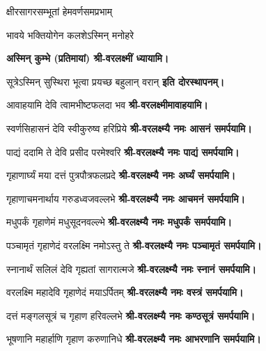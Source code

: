 \begin{center}

{क्षीरसागरसम्भूतां हेमवर्णसमप्रभाम्}

{भावये भक्तियोगेन कलशेऽस्मिन् मनोहरे} 

\textbf{अस्मिन् कुम्भे (प्रतिमायां) श्री-वरलक्ष्मीं ध्यायामि।}
\medskip


{सूत्रेऽस्मिन् सुस्थिरा भूत्वा प्रयच्छ बहुलान् वरान्} 
\textbf{इति दोरस्थापनम्।}\medskip

{आवाहयामि देवि त्वामभीष्टफलदा भव}
\textbf{श्री-वरलक्ष्मीमावाहयामि।}

{स्वर्णसिहासनं देवि स्वीकुरुष्व हरिप्रिये} 
\textbf{श्री-वरलक्ष्म्यै नमः आसनं समर्पयामि।}


{पाद्यं ददामि ते देवि प्रसीद परमेश्वरि}
\textbf{श्री-वरलक्ष्म्यै नमः पाद्यं समर्पयामि।}
\medskip

{गृहाणार्घ्यं मया दत्तं पुत्रपौत्रफलप्रदे}
\textbf{श्री-वरलक्ष्म्यै नमः अर्घ्यं समर्पयामि।}
\medskip

{गृहाणाचमनार्थाय गरुडध्वजवल्लभे}
\textbf{श्री-वरलक्ष्म्यै नमः आचमनं समर्पयामि।}
\medskip

{मधुपर्कं गृहाणेमं मधुसूदनवल्ल्भे}
\textbf{श्री-वरलक्ष्म्यै नमः मधुपर्कं समर्पयामि।}
\medskip

{पञ्चामृतं गृहाणेदं वरलक्ष्मि नमोऽस्तु ते}
\textbf{श्री-वरलक्ष्म्यै नमः पञ्चामृतं समर्पयामि।}
\medskip

{स्नानार्थं सलिलं देवि गृह्यतां सागरात्मजे}
\textbf{श्री-वरलक्ष्म्यै नमः स्नानं समर्पयामि।}
\medskip

{वरलक्ष्मि महादेवि गृहाणेदं मयाऽर्पितम्}
\textbf{श्री-वरलक्ष्म्यै नमः वस्त्रं समर्पयामि।}
\medskip

{दत्तं मङ्गलसूत्रं च गृहाण हरिवल्लभे}
\textbf{श्री-वरलक्ष्म्यै नमः कण्ठसूत्रं समर्पयामि।}
\medskip

{भूषणानि महार्हाणि गृहाण करुणानिधे}
\textbf{श्री-वरलक्ष्म्यै नमः आभरणानि समर्पयामि।}
\medskip


\end{center}
